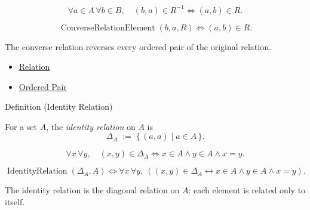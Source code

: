 \begin{remark*}
\[
  \forall a\in A\,\forall b\in B,\quad
  (b,a)\in R^{-1}
  \iff
  (a,b)\in R.
\]
\end{remark*}

\begin{remark*}
\[
  \operatorname{ConverseRelationElement}(b,a,R)
  \iff
  (a,b)\in R.
\]
\end{remark*}

\begin{remark*}[Interpretation]
The converse relation reverses every ordered pair of the original relation.
\end{remark*}

\begin{dependencies}
\begin{itemize}
  \item \hyperref[def:relation]{Relation}
  \item \hyperref[def:ordered-pair]{Ordered Pair}
\end{itemize}
\end{dependencies}

\begin{definitionbox}{Definition (Identity Relation)}
\begin{definition}\label{def:relation-identity}
For a set $A$, the \emph{identity relation} on $A$ is
\[
\Delta_A
\;:=\;
\{\, (a,a)\mid a\in A\,\}.
\]
\end{definition}
\end{definitionbox}

\begin{remark*}
\[
  \forall x\,\forall y,\quad
  (x,y)\in\Delta_A
  \iff
  x\in A \wedge y\in A \wedge x=y.
\]
\end{remark*}

\begin{remark*}
\[
  \operatorname{IdentityRelation}(\Delta_A,A)
  \iff
  \forall x\,\forall y,\ ((x,y)\in\Delta_A \leftrightarrow x\in A \wedge y\in A \wedge x=y).
\]
\end{remark*}

\begin{remark*}[Interpretation]
The identity relation is the diagonal relation on $A$: each element is related
only to itself.
\end{remark*}

